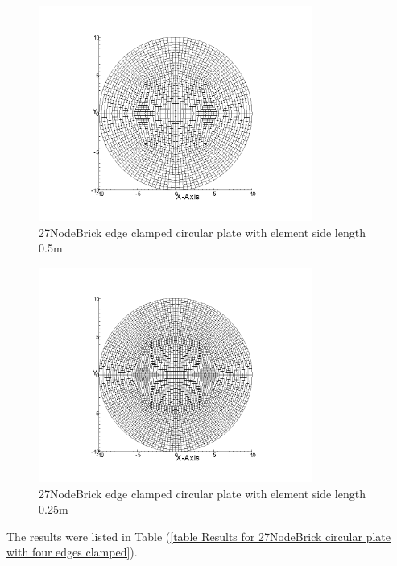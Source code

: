 \documentclass[fleqn,11pt,letter]{article}
\begin{document}
\begin{figure}[H]
  \centering
  \includegraphics[width=9cm]{../Figure_files/27NodeBrick/circular_plate5.png}
  \caption{27NodeBrick edge clamped circular plate with element side length 0.5m }
  \label{fig 27NodeBrick edges clamped circular plate with element side length 0.5m }
\end{figure}

\newpage

\begin{figure}[H]
  \centering
  \includegraphics[width=9cm]{../Figure_files/27NodeBrick/circular_plate6.png}
  \caption{27NodeBrick edge clamped circular plate with element side length 0.25m }
  \label{fig 27NodeBrick edges clamped circular plate with element side length 0.25m }
\end{figure}

The results were listed in Table (\ref{table Results for 27NodeBrick circular plate with four edges clamped}).
\end{document}
